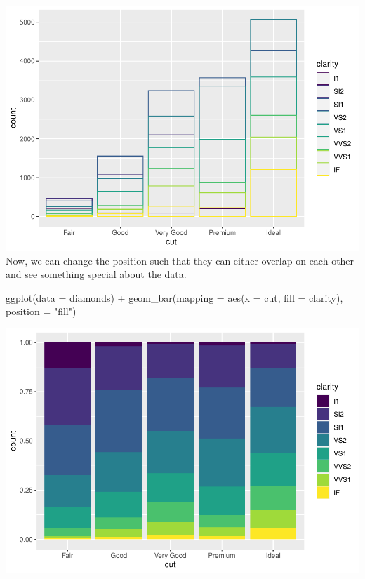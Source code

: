 \documentclass[
]{article}
\newenvironment{Shaded}{\begin{snugshade}}{\end{snugshade}}
\newcommand{\AttributeTok}[1]{\textcolor[rgb]{0.77,0.63,0.00}{#1}}
\newcommand{\FunctionTok}[1]{\textcolor[rgb]{0.00,0.00,0.00}{#1}}
\newcommand{\NormalTok}[1]{#1}
\newcommand{\SpecialCharTok}[1]{\textcolor[rgb]{0.00,0.00,0.00}{#1}}
\newcommand{\StringTok}[1]{\textcolor[rgb]{0.31,0.60,0.02}{#1}}
\begin{document}
\includegraphics{Journal_files/figure-latex/unnamed-chunk-48-5.pdf} Now,
we can change the position such that they can either overlap on each
other and see something special about the data.

\begin{Shaded}
\begin{Highlighting}[]
\FunctionTok{ggplot}\NormalTok{(}\AttributeTok{data =}\NormalTok{ diamonds) }\SpecialCharTok{+} 
  \FunctionTok{geom\_bar}\NormalTok{(}\AttributeTok{mapping =} \FunctionTok{aes}\NormalTok{(}\AttributeTok{x =}\NormalTok{ cut, }\AttributeTok{fill =}\NormalTok{ clarity), }\AttributeTok{position =} \StringTok{"fill"}\NormalTok{)}
\end{Highlighting}
\end{Shaded}

\includegraphics{Journal_files/figure-latex/unnamed-chunk-49-1.pdf}
\end{document}
